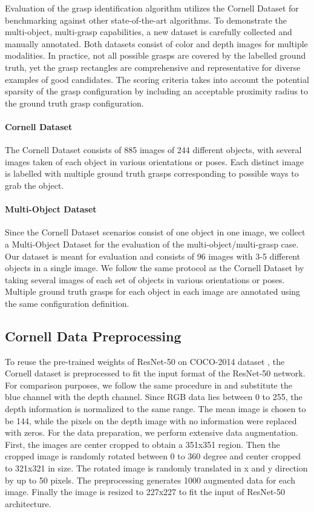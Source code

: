 \documentclass[letterpaper, 10 pt, journal, twoside]{IEEEtran}
\begin{document}
Evaluation of the grasp identification algorithm utilizes the Cornell
Dataset for benchmarking against other state-of-the-art algorithms. To demonstrate
the multi-object, multi-grasp capabilities, a new dataset is carefully collected and manually annotated.
Both datasets consist of color and depth images for multiple
modalities. In practice, not all possible grasps are covered by the labelled
ground truth, yet the grasp rectangles are comprehensive and representative for
diverse examples of good candidates. The scoring criteria takes into
account the potential sparsity of the grasp configuration by including an
acceptable proximity radius to the ground truth grasp configuration.

\paragraph{Cornell Dataset}
The Cornell Dataset \cite{cornell2013} consists of 885 images of 244
different objects, with several images taken of each object in various
orientations or poses. Each distinct image is labelled with multiple
ground truth grasps corresponding to possible ways to grab the object. 


\paragraph{Multi-Object Dataset}
Since the Cornell Dataset scenarios consist of one object in one image,
we collect a Multi-Object Dataset for the evaluation of the
multi-object/multi-grasp case. Our dataset is meant for evaluation and
consists of 96 images with 3-5 different objects in a single image. We
follow the same protocol as the Cornell Dataset by taking several images of
each set of objects in various orientations or poses. Multiple ground truth
grasps for each object in each image are annotated using the same
configuration definition.


\subsection{Cornell Data Preprocessing}
To reuse the pre-trained weights of ResNet-50 on COCO-2014 dataset
\cite{lin2014microsoft}, the Cornell dataset is preprocessed to fit the
input format of the ResNet-50 network. For comparison purposes, we follow
the same procedure in \cite{redmon2015real} and substitute the blue channel 
with the depth channel.  Since RGB data lies between 0 to 255, the depth
information is normalized to the same range.  The mean image is chosen
to be 144, while the pixels on the depth image with no information were
replaced with zeros.  For the data preparation, we perform extensive data
augmentation. First, the images are center cropped to obtain a 351x351
region. Then the cropped image is randomly rotated between 0 to 360
degree and center cropped to 321x321 in size.  The rotated image is
randomly translated in x and y direction by up to 50 pixels. The
preprocessing generates 1000 augmented data for each image. Finally the
image is resized to 227x227 to fit the input of ResNet-50 architecture.       
\end{document}
